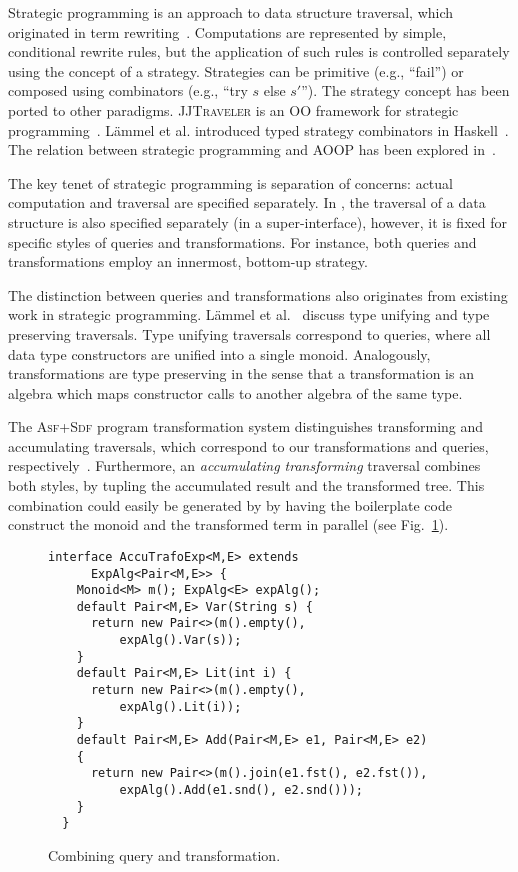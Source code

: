 Strategic programming is an approach to data structure traversal,
which originated in term
rewriting~\cite{borovansky1996elan,visser1998core,vandenBrand:2003:TRT:941566.941568}.
Computations are represented by simple, conditional rewrite rules, but
the application of such rules is controlled separately using the
concept of a strategy.  Strategies can be primitive (e.g., ``fail'')
or composed using combinators (e.g., ``try $s$ else $s'$'').  The
strategy concept has been ported to other paradigms.
\textsc{JJTraveler} is an OO framework for strategic
programming~\cite{visser01visitor}.  L\"ammel et al. introduced typed
strategy combinators in Haskell~\cite{lammel2002typed}.  The relation
between strategic programming and AOOP has been explored
in~\cite{lammel2003strategic}.

The key tenet of strategic programming is separation of concerns:  actual computation and traversal are specified separately.
In \name, the traversal of a data structure is also specified separately (in a super-interface), however, it is fixed for specific styles of queries and transformations.
For instance, both queries and transformations employ an innermost, bottom-up strategy.

The distinction between queries and transformations also originates from existing work in strategic programming.
L\"ammel et al.~\cite{lammel2002typed} discuss type unifying and type preserving traversals.
Type unifying traversals correspond to queries, where all data type constructors are unified into a single monoid.
Analogously, \name transformations are type preserving in the sense that a transformation is an algebra which maps constructor calls to another algebra of the same type.

The \textsc{Asf+Sdf} program transformation system distinguishes transforming and accumulating traversals, which correspond to our transformations and queries, respectively~\cite{vandenBrand:2003:TRT:941566.941568}.
Furthermore, an \textit{accumulating transforming} traversal combines both styles, by tupling the accumulated result and the transformed tree.
This combination could easily be generated by \name by having the boilerplate code construct the monoid and the transformed term in parallel (see Fig.~\ref{FIG:accuTrafo}).

\begin{figure}[t]
\nocaptionrule
\begin{lstlisting}[mathescape=true]
  interface AccuTrafoExp<M,E> extends
      ExpAlg<Pair<M,E>> {
    Monoid<M> m(); ExpAlg<E> expAlg();
    default Pair<M,E> Var(String s) {
      return new Pair<>(m().empty(),
          expAlg().Var(s));
    }
    default Pair<M,E> Lit(int i) {
      return new Pair<>(m().empty(),
          expAlg().Lit(i));
    }
    default Pair<M,E> Add(Pair<M,E> e1, Pair<M,E> e2)
    {
      return new Pair<>(m().join(e1.fst(), e2.fst()),
          expAlg().Add(e1.snd(), e2.snd()));
    }
  }
\end{lstlisting}
\caption{Combining query and transformation.}
\label{FIG:accuTrafo}
\end{figure}

